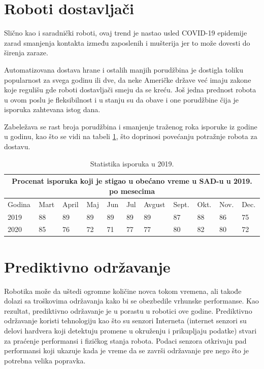 \documentclass{article}
\begin{document}
	\section{Roboti dostavljači}
	Slično kao i saradnički roboti, ovaj trend je nastao usled COVID-19 epidemije zarad smanjenja kontakta između zaposlenih i mušterija jer to može dovesti do širenja zaraze.
	
	Automatizovana dostava hrane i ostalih manjih porudžbina je dostigla toliku popularnost za svega godinu ili dve, da neke Američke države već imaju zakone koje regulišu gde roboti dostavljači smeju da se kreću. Još jedna prednost robota u ovom poslu je fleksibilnost i u stanju su da obave i one porudžbine čija je isporuka zahtevana istog dana. 
 
 Zabeležava se rast broja porudžbina i smanjenje traženog roka isporuke iz godine u godinu, kao što se vidi na tabeli \ref{table}, što doprinosi povećanju potražnje robota za dostavu. \cite{robotics2022, sameday}  
	\vspace{0.25cm}
	\begin{table}
    \centering
		\begin{tabular}{ |p{1cm}|p{1cm}|p{1cm}|p{1cm} |p{1cm}|p{1cm}|p{1cm}|p{1cm}|p{1cm}|p{1cm}|p{1cm}|}
			\hline
			\multicolumn{11}{|c|}{Procenat isporuka koji je stigao u obećano vreme u SAD-u u 2019. po mesecima} \\
			\hline
			Godina & Mart & April & Maj & Jun & Jul & Avgust & Sept. & Okt. & Nov. & Dec. \\
			\hline
			2019 & 88 & 89 & 89 & 89 & 89 & 89 & 87 & 88 & 86 & 75 \\
			2020 & 85 & 76 & 72 & 71 & 77 & 77 & 80 & 82 & 80 & 72 \\
			\hline
		\end{tabular}
  \caption{Statistika isporuka u 2019.}
      \label{table}
	\end{table}
	
	\section{Prediktivno održavanje}
	Robotika može da uštedi ogromne količine novca tokom vremena, ali takođe dolazi sa troškovima održavanja kako bi se obezbedile vrhunske performanse. Kao rezultat, prediktivno održavanje je u porastu u robotici ove godine. Prediktivno održavanje koristi tehnologiju kao što su senzori Interneta (internet senzori su delovi hardvera koji detektuju promene u okruženju i prikupljaju podatke) stvari za praćenje performansi i fizičkog stanja robota. Podaci senzora otkrivaju pad performansi koji ukazuje kada je vreme da se završi održavanje pre nego što je potrebna velika popravka.
	
\end{document}
